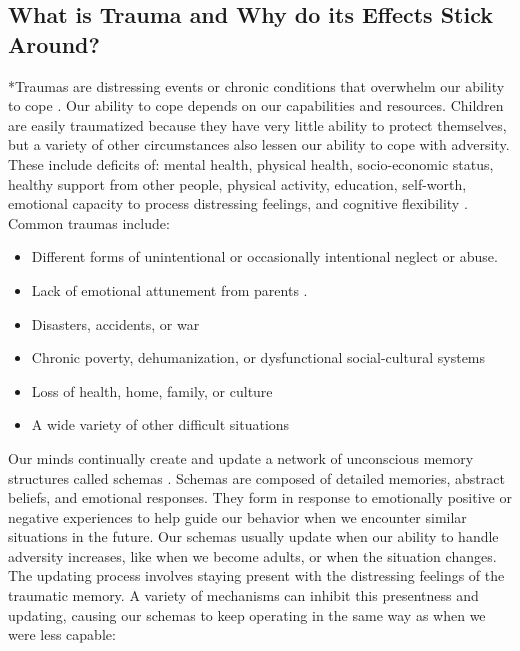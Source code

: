 \documentclass[12pt,letterpaper]{article}
\begin{document}
\subsection{What is Trauma and Why do its Effects Stick Around?}
*Traumas are distressing events or chronic conditions that overwhelm our ability to cope \cite{laneReconsolidation}. Our ability to cope depends on our capabilities and resources. Children are easily traumatized because they have very little ability to protect themselves, but a variety of other circumstances also lessen our ability to cope with adversity.  These include deficits of: mental health, physical health, socio-economic status, healthy support from other people, physical activity, education, self-worth, emotional capacity to process distressing feelings, and cognitive flexibility \cite{sayedRiskFactors,tangRiskFactors,trickeyRiskFactors}. Common traumas include:
\begin{itemize}
    \item Different forms of unintentional or occasionally intentional neglect or abuse.
    \item Lack of emotional attunement from parents \cite{brownAttachmentDisturbances}.
    \item Disasters, accidents, or war
    \item Chronic poverty, dehumanization, or dysfunctional social-cultural systems \cite{roncaStructuralViolence}
    \item Loss of health, home, family, or culture
    \item A wide variety of other difficult situations
\end{itemize}
Our minds continually create and update a network of unconscious memory structures called schemas \cite{eckerUnlocking}. Schemas are composed of detailed memories, abstract beliefs, and emotional responses. They form in response to emotionally positive or negative experiences to help guide our behavior when we encounter similar situations in the future.  Our schemas usually update when our ability to handle adversity increases, like when we become adults, or when the situation changes. The updating process involves staying present with the distressing feelings of the traumatic memory. A variety of mechanisms can inhibit this presentness and updating, causing our schemas to keep operating in the same way as when we were less capable:
\end{document}
